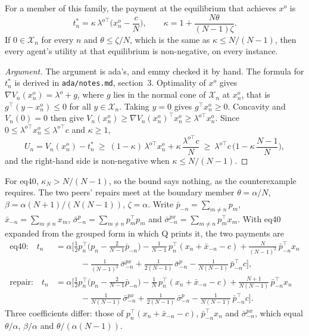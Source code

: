 \documentclass{article}
\begin{document}
\begin{proposition}\label{prop:repair}
For a member of this family, the payment at the equilibrium that achieves \(x^o\) is
\[
t^*_n=\kappa\,\lambda^{o\top}\Big(x^o_n-\frac cN\Big),\qquad \kappa=1+\frac{N\theta}{(N-1)\zeta}.
\]
If \(0\in\mathcal{X}_n\) for every \(n\) and \(\theta\le\zeta/N\), which is the same as \(\kappa\le N/(N-1)\), then every agent's utility at that equilibrium is non-negative, on every instance.
\end{proposition}

\begin{proof}[Argument]
The argument is ada's, and emmy checked it by hand.
The formula for \(t^*_n\) is derived in \texttt{ada/notes.md}, section~3.
Optimality of \(x^o\) gives \(\nabla V_n(x^o_n)=\lambda^o+g\), where \(g\) lies in the normal cone of \(\mathcal{X}_n\) at \(x^o_n\), that is \(g^\top(y-x^o_n)\le0\) for all \(y\in\mathcal{X}_n\).
Taking \(y=0\) gives \(g^\top x^o_n\ge0\).
Concavity and \(V_n(0)=0\) then give \(V_n(x^o_n)\ge\nabla V_n(x^o_n)^\top x^o_n\ge\lambda^{o\top}x^o_n\).
Since \(0\le\lambda^{o\top}x^o_n\le\lambda^{o\top}c\) and \(\kappa\ge1\),
\[
U_n=V_n(x^o_n)-t^*_n\ \ge\ (1-\kappa)\,\lambda^{o\top}x^o_n+\kappa\,\frac{\lambda^{o\top}c}{N}\ \ge\ \lambda^{o\top}c\,\Big(1-\kappa\,\frac{N-1}{N}\Big),
\]
and the right-hand side is non-negative when \(\kappa\le N/(N-1)\).
\end{proof}

For eq40, \(\kappa_N>N/(N-1)\), so the bound says nothing, as the counterexample requires.
The two peers' repairs meet at the boundary member \(\theta=\alpha/N\), \(\beta=\alpha(N+1)/(N(N-1))\), \(\zeta=\alpha\).
Write \(\bar p_{-n}=\sum_{m\ne n}p_m\), \(\bar x_{-n}=\sum_{m\ne n}x_m\), \(\bar\sigma^p_{-n}=\sum_{m\ne n}p_m^\top p_m\) and \(\bar\sigma^{px}_{-n}=\sum_{m\ne n}p_m^\top x_m\).
With eq40 expanded from the grouped form in which Q prints it, the two payments are
\begin{align*}
\text{eq40:}\quad t_n&=\alpha\Big[\tfrac12p_n^\top\big(p_n-\tfrac{2}{N-1}\bar p_{-n}\big)-\tfrac{1}{N-1}\,p_n^\top(x_n+\bar x_{-n}-c)+\tfrac{N}{(N-1)^2}\,\bar p_{-n}^\top x_n\\
&\qquad\quad-\tfrac{1}{(N-1)^2}\,\bar\sigma^{px}_{-n}+\tfrac{1}{2(N-1)}\,\bar\sigma^{p}_{-n}-\tfrac{1}{N(N-1)}\,\bar p_{-n}^\top c\Big],\\
\text{repair:}\quad t_n&=\alpha\Big[\tfrac12p_n^\top\big(p_n-\tfrac{2}{N-1}\bar p_{-n}\big)-\tfrac{1}{N}\,p_n^\top(x_n+\bar x_{-n}-c)+\tfrac{N+1}{N(N-1)}\,\bar p_{-n}^\top x_n\\
&\qquad\quad-\tfrac{1}{N(N-1)}\,\bar\sigma^{px}_{-n}+\tfrac{1}{2(N-1)}\,\bar\sigma^{p}_{-n}-\tfrac{1}{N(N-1)}\,\bar p_{-n}^\top c\Big].
\end{align*}
Three coefficients differ: those of \(p_n^\top(x_n+\bar x_{-n}-c)\), \(\bar p_{-n}^\top x_n\) and \(\bar\sigma^{px}_{-n}\), which equal \(\theta/\alpha\), \(\beta/\alpha\) and \(\theta/(\alpha(N-1))\).
\end{document}
